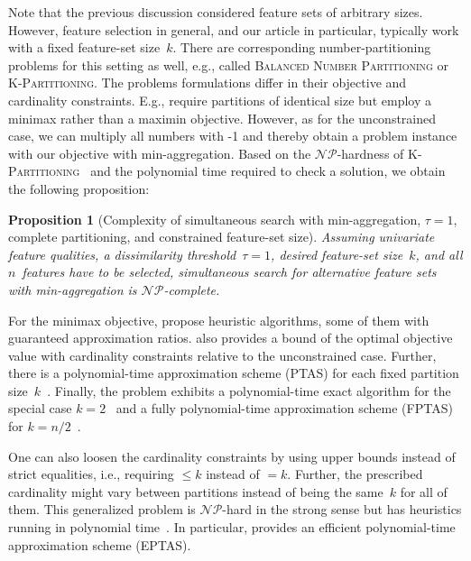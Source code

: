 \documentclass{article}
\newtheorem{proposition}{Proposition}
\theoremstyle{definition}
\begin{document}
Note that the previous discussion considered feature sets of arbitrary sizes.
However, feature selection in general, and our article in particular, typically work with a fixed feature-set size~$k$.
There are corresponding number-partitioning problems for this setting as well, e.g., called \textsc{Balanced Number Partitioning} or \textsc{K-Partitioning}.
The problems formulations differ in their objective and cardinality constraints.
E.g., \cite{babel1998thek, michiels2012computer, zhang2011heuristic} require partitions of identical size but employ a minimax rather than a maximin objective.
However, as for the unconstrained case, we can multiply all numbers with -1 and thereby obtain a problem instance with our objective with min-aggregation.
Based on the $\mathcal{NP}$-hardness of \textsc{K-Partitioning}~\cite{babel1998thek} and the polynomial time required to check a solution, we obtain the following proposition:
%
\begin{proposition}[Complexity of simultaneous search with min-aggregation, $\tau=1$, complete partitioning, and constrained feature-set size]
	Assuming univariate feature qualities, a dissimilarity threshold~$\tau = 1$, desired feature-set size~$k$, and all $n$~features have to be selected, simultaneous search for alternative feature sets with min-aggregation is $\mathcal{NP}$-complete.
	\label{prop:afs:complexity-partitioning-min-constrained-k}
\end{proposition}
%
For the minimax objective, \cite{babel1998thek, michiels2012computer, zhang2011heuristic} propose heuristic algorithms, some of them with guaranteed approximation ratios.
\cite{babel1998thek} also provides a bound of the optimal objective value with cardinality constraints relative to the unconstrained case.
Further, there is a polynomial-time approximation scheme (PTAS) for each fixed partition size~$k$~\cite{michiels2012computer}.
Finally, the problem exhibits a polynomial-time exact algorithm for the special case $k=2$~\cite{dellamico2004heuristic, dellamico2001bounds} and a fully polynomial-time approximation scheme (FPTAS) for $k=n/2$~\cite{woeginger2005comment}.

One can also loosen the cardinality constraints by using upper bounds instead of strict equalities, i.e., requiring $\leq k$ instead of $= k$.
Further, the prescribed cardinality might vary between partitions instead of being the same~$k$ for all of them.
This generalized problem is $\mathcal{NP}$-hard in the strong sense but has heuristics running in polynomial time~\cite{kellerer2011a32approximation}.
In particular, \cite{chen2016efficient} provides an efficient polynomial-time approximation scheme (EPTAS).
\end{document}
